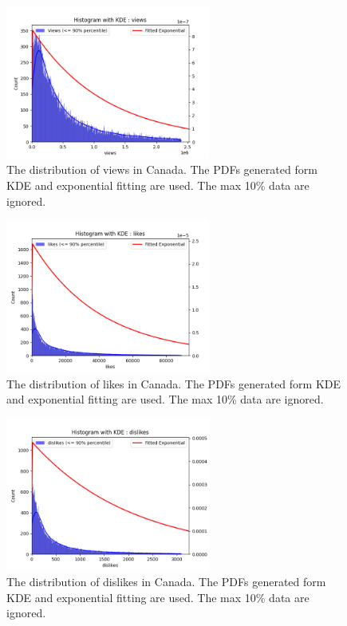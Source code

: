 \documentclass[sigplan,screen]{acmart}
\begin{document}
\begin{figure}[H]
  \centering
  \includegraphics[width=0.6\textwidth]{figure/CAviewsDistrbution.png} 
  \caption{The distribution of views in Canada. The PDFs generated form KDE and exponential fitting are used. The max 10\% data are ignored.}
  \label{fig:views} 
  \end{figure}
  \begin{figure}[H]
    \centering
    \includegraphics[width=0.6\textwidth]{figure/CAlikesDistrbution.png} 
    \caption{The distribution of likes in Canada. The PDFs generated form KDE and exponential fitting are used. The max 10\% data are ignored.}
    \label{fig:likes} 
    \end{figure}
    \begin{figure}[H]
      \centering
      \includegraphics[width=0.6\textwidth]{figure/CAdislikesDistrbution.png} 
      \caption{The distribution of dislikes in Canada. The PDFs generated form KDE and exponential fitting are used. The max 10\% data are ignored.}
      \label{fig:dislikes} 
      \end{figure}
\end{document}
